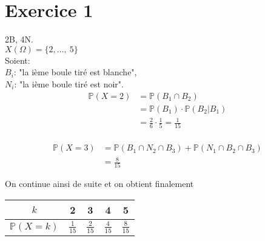 \documentclass[td3.tex]{subfiles}
\begin{document}
\section{Exercice 1}
2B, 4N. \\
$X(\Omega) = \{2,\dots,~5\}$\\
Soient:\\
$B_i$: "la ième boule tiré est blanche", \\
$N_i$: "la ième boule tiré est noir".\\
\begin{align*}
  \mathbb{P}(X=2) & =\mathbb{P}(B_1 \cap B_2) \\
  &=\mathbb{P}(B_1) \cdot \mathbb{P}(B_2|B_1) \\
  &=\frac{2}{6}\cdot \frac{1}{5} = \frac{1}{15} \\
\end{align*}

\begin{align*}
  \mathbb{P}(X=3) &=\mathbb{P}(B_1 \cap N_2 \cap B_3) + \mathbb{P}(N_1 \cap B_2 \cap B_3) \\
  &=\frac{8}{15}
\end{align*}

On continue ainsi de suite et on obtient finalement \\
\begin{center}

\begin{tabular}{|c|c|c|c|c|}
  \hline
  \textbf{$k$} & 2 & 3 & 4 & 5 \\
  \hline
  \textbf{$\mathbb{P}(X=k)$} & $\frac{1}{15}$ & $\frac{2}{15}$ & $\frac{4}{15}$ & $\frac{8}{15}$ \\
  \hline
\end{tabular}
\end{center}
\end{document}
